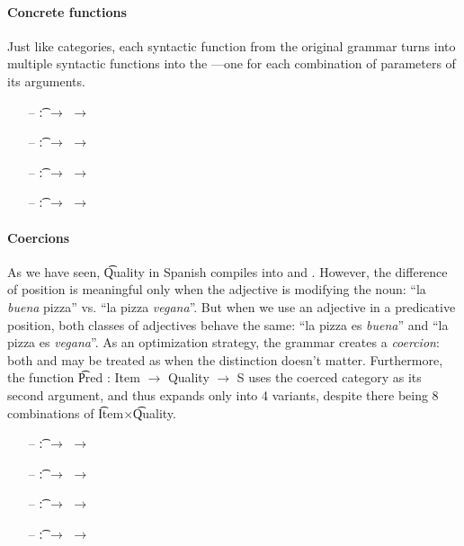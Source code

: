 \paragraph{Concrete functions}
Just like categories, each syntactic function from the original
grammar turns into multiple syntactic functions into the
\pmcfg{}---one for each combination of parameters of its arguments.

\begin{itemize}
\setlength\itemsep{0em}
\item[--]  \t{:}  $\rightarrow$  $\rightarrow$ 
\item[--]   \t{:}  $\rightarrow$  $\rightarrow$ 
\item[--]  \t{:}  $\rightarrow$  $\rightarrow$ 
\item[--]  \t{:}  $\rightarrow$  $\rightarrow$ 
\end{itemize}


\paragraph{Coercions}
\label{sec:Coercions}
As we have seen, \t{Quality} in Spanish compiles into  and
. However, the difference of position is meaningful only when the
adjective is modifying the noun: ``la \emph{buena} pizza'' vs. ``la pizza
\emph{vegana}''. But when we use an adjective in a predicative position, both
classes of adjectives behave the same: ``la pizza es \emph{buena}''
and ``la pizza es \emph{vegana}''. As an optimization strategy, the
grammar creates a {\it coercion}: both  and 
may be treated as \quality{*} when the distinction doesn't matter. 
Furthermore, the function \t{Pred : Item $\rightarrow$ Quality $\rightarrow$ S} uses
the coerced category \quality{*} as its second argument, and thus
expands only into 4 variants, despite there being 8 combinations of
\t{Item}$\times$\t{Quality}.

\begin{itemize}
\setlength\itemsep{0em}
\item[--]  \t{:}  $\rightarrow$ \quality{*} $\rightarrow$ \comment
\item[--]   \t{:}  $\rightarrow$ \quality{*} $\rightarrow$ \comment
\item[--]   \t{:}  $\rightarrow$ \quality{*} $\rightarrow$ \comment
\item[--]  \t{:}  $\rightarrow$ \quality{*} $\rightarrow$ \comment
\end{itemize}



